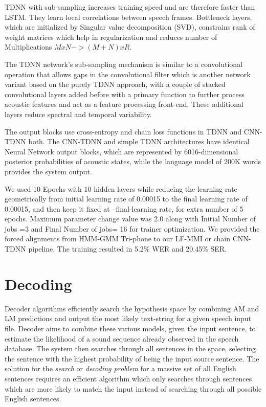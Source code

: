 TDNN with sub-sampling increases training speed and are therefore faster than LSTM. They learn local correlations between speech frames. Bottleneck layers, which are initialized by Singular value decomposition (SVD), constrains rank of weight matrices which help in regularization and reduces number of Multiplications $M x N -> (M+N) x R$. 

The TDNN network's sub-sampling mechanism is similar to a convolutional operation that allows gaps in the convolutional filter which is another network variant based on the purely TDNN approach, with a couple of stacked convolutional layers added before with a primary function to further process acoustic features and act as a feature processing front-end. These additional layers reduce spectral and temporal variability. 

The output blocks use cross-entropy and chain loss functions in TDNN and CNN-TDNN both. The CNN-TDNN and simple TDNN architectures have identical Neural Network output blocks, which are represented by 6016-dimensional posterior probabilities of acoustic states, while the language model of 200K words provides the system output. 

We used 10 Epochs with 10 hidden layers while reducing the learning rate geometrically from initial learning rate of 0.00015 to the final learning rate of 0.00015, and then keep it fixed at –final-learning rate, for extra number of 5 epochs. Maximum parameter change value was 2.0 along with Initial Number of jobs =3 and Final Number of jobs= 16 for trainer optimization. We provided the forced alignments from HMM-GMM Tri-phone to our LF-MMI or chain CNN-TDNN pipeline. The training resulted in 5.2\% WER and 20.45\% SER.

\section{Decoding}
\label{sub:decoding}

Decoder algorithms efficiently search the hypothesis space by combining AM and LM predictions and output the most likely text-string for a given speech input file. Decoder aims to combine these various models, given the input sentence, to estimate the likelihood of a sound sequence already observed in the speech database. The system then searches through all sentences in the space, selecting the sentence with the highest probability of being the input source sentence. The solution for the \textit{search} or \textit{decoding problem} for a massive set of all English sentences requires an efficient algorithm which only searches through sentences which are more likely to match the input instead of searching through all possible English sentences.


